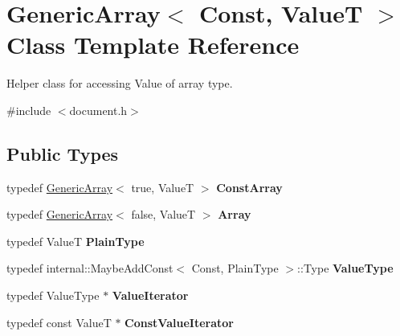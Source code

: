 \hypertarget{class_generic_array}{}\section{Generic\+Array$<$ Const, ValueT $>$ Class Template Reference}
\label{class_generic_array}


Helper class for accessing Value of array type.  




{\ttfamily \#include $<$document.\+h$>$}

\subsection*{Public Types}
\begin{DoxyCompactItemize}
\item 
typedef \hyperlink{class_generic_array}{Generic\+Array}$<$ true, ValueT $>$ {\bfseries Const\+Array}\hypertarget{class_generic_array_a84f0b14518bc5cc44b4ff76a7d5ef81b}{}\label{class_generic_array_a84f0b14518bc5cc44b4ff76a7d5ef81b}

\item 
typedef \hyperlink{class_generic_array}{Generic\+Array}$<$ false, ValueT $>$ {\bfseries Array}\hypertarget{class_generic_array_a6683902e86c051c2319e873537dca7b1}{}\label{class_generic_array_a6683902e86c051c2319e873537dca7b1}

\item 
typedef ValueT {\bfseries Plain\+Type}\hypertarget{class_generic_array_aecea8be3dca6799bc523f4bffd221839}{}\label{class_generic_array_aecea8be3dca6799bc523f4bffd221839}

\item 
typedef internal\+::\+Maybe\+Add\+Const$<$ Const, Plain\+Type $>$\+::Type {\bfseries Value\+Type}\hypertarget{class_generic_array_a93e53f38a99fc5167eb2a28653de64ed}{}\label{class_generic_array_a93e53f38a99fc5167eb2a28653de64ed}

\item 
typedef Value\+Type $\ast$ {\bfseries Value\+Iterator}\hypertarget{class_generic_array_afc6ad62c3f00531fa378db266182704a}{}\label{class_generic_array_afc6ad62c3f00531fa378db266182704a}

\item 
typedef const ValueT $\ast$ {\bfseries Const\+Value\+Iterator}\hypertarget{class_generic_array_a1cd7bb3e75ccfeed3e8b0a6bb5563d68}{}\label{class_generic_array_a1cd7bb3e75ccfeed3e8b0a6bb5563d68}


\end{DoxyCompactItemize}
